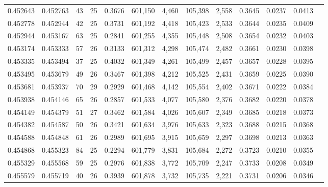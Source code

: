 \begin{tabular}{rrrrrrrrrrrrr}
0.452643 & 0.452763 &    43 &  25 &                                     0.3676 & 601,150 &   4,460 & 105,398 &   2,558 & 0.3645 & 0.0237 & 0.0413 \\
0.452778 & 0.452944 &    42 &  25 &                                     0.3731 & 601,192 &   4,418 & 105,423 &   2,533 & 0.3644 & 0.0235 & 0.0409 \\
0.452944 & 0.453167 &    63 &  25 &                                     0.2841 & 601,255 &   4,355 & 105,448 &   2,508 & 0.3654 & 0.0232 & 0.0403 \\
0.453174 & 0.453333 &    57 &  26 &                                     0.3133 & 601,312 &   4,298 & 105,474 &   2,482 & 0.3661 & 0.0230 & 0.0398 \\
0.453335 & 0.453494 &    37 &  25 &                                     0.4032 & 601,349 &   4,261 & 105,499 &   2,457 & 0.3657 & 0.0228 & 0.0395 \\
0.453495 & 0.453679 &    49 &  26 &                                     0.3467 & 601,398 &   4,212 & 105,525 &   2,431 & 0.3659 & 0.0225 & 0.0390 \\
0.453681 & 0.453937 &    70 &  29 &                                     0.2929 & 601,468 &   4,142 & 105,554 &   2,402 & 0.3671 & 0.0222 & 0.0384 \\
0.453938 & 0.454146 &    65 &  26 &                                     0.2857 & 601,533 &   4,077 & 105,580 &   2,376 & 0.3682 & 0.0220 & 0.0378 \\
0.454149 & 0.454379 &    51 &  27 &                                     0.3462 & 601,584 &   4,026 & 105,607 &   2,349 & 0.3685 & 0.0218 & 0.0373 \\
0.454382 & 0.454587 &    50 &  26 &                                     0.3421 & 601,634 &   3,976 & 105,633 &   2,323 & 0.3688 & 0.0215 & 0.0368 \\
0.454588 & 0.454848 &    61 &  26 &                                     0.2989 & 601,695 &   3,915 & 105,659 &   2,297 & 0.3698 & 0.0213 & 0.0363 \\
0.454868 & 0.455323 &    84 &  25 &                                     0.2294 & 601,779 &   3,831 & 105,684 &   2,272 & 0.3723 & 0.0210 & 0.0355 \\
0.455329 & 0.455568 &    59 &  25 &                                     0.2976 & 601,838 &   3,772 & 105,709 &   2,247 & 0.3733 & 0.0208 & 0.0349 \\
0.455579 & 0.455719 &    40 &  26 &                                     0.3939 & 601,878 &   3,732 & 105,735 &   2,221 & 0.3731 & 0.0206 & 0.0346 \\

\end{tabular}
